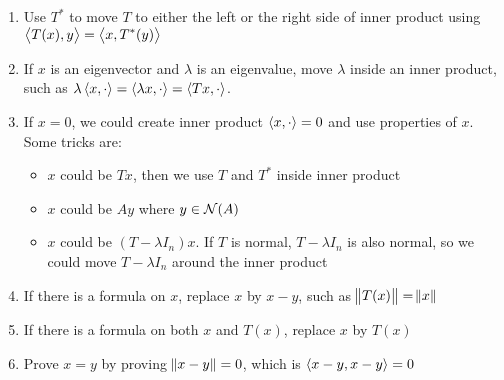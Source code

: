 \begin{enumerate}
    \item Use $T^*$ to move $T$ to either the left or the right side of inner product using $\left\langle \displaystyle T(x), y \right\rangle = \left\langle \displaystyle x, T^* (y) \right\rangle$
    \item If $x$ is an eigenvector and $\lambda$ is an eigenvalue, move $\lambda$ inside an inner product, such as $\lambda \left\langle \displaystyle x, \cdot \right\rangle = \left\langle \displaystyle \lambda x, \cdot \right\rangle = \left\langle \displaystyle Tx, \cdot \right\rangle$.
    \item If $x=0$, we could create inner product $\left\langle \displaystyle x, \cdot \right\rangle = 0$ and use properties of $x$. Some tricks are:
        \begin{itemize}
            \item $x$ could be $Tx$, then we use $T$ and $T^*$ inside inner product
            \item $x$ could be $Ay$ where $y \in \mathcal{N}(A)$
            \item $x$ could be $(T - \lambda I_n)x$. If $T$ is normal, $T-\lambda I_n$ is also normal, so we could move $T-\lambda I_n$ around the inner product
        \end{itemize}
    \item If there is a formula on $x$, replace $x$ by $x-y$, such as $\norm{T(x)} = \norm{x}$
    \item If there is a formula on both $x$ and $T(x)$, replace $x$ by $T(x)$
    \item Prove $x = y$ by proving $\norm{x - y} = 0$, which is $\left\langle \displaystyle x - y, x - y \right\rangle = 0$
\end{enumerate}

